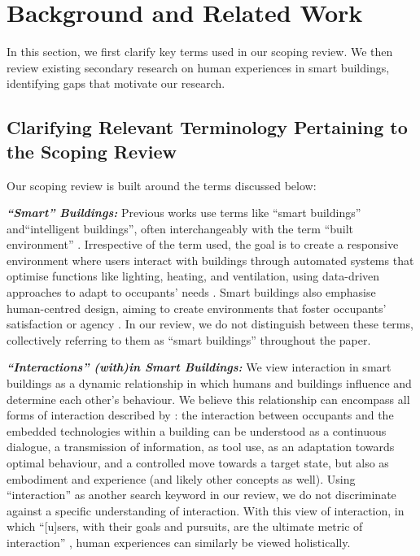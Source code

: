 \section{Background and Related Work}
\label{sec-ch1:background}
In this section, we first clarify key terms used in our scoping review. We then review existing secondary research on human experiences in smart buildings, identifying gaps that motivate our research.

\subsection{Clarifying Relevant Terminology Pertaining to the Scoping Review}
Our scoping review is built around the terms discussed below: 

\textbf{\textit{``Smart'' Buildings:}} Previous works use terms like ``smart buildings'' and``intelligent buildings'', often interchangeably with the term ``built environment'' \cite{buckman2014smart, latifah2020smart}. Irrespective of the term used, the goal is to create a responsive environment where users interact with buildings through automated systems that optimise functions like lighting, heating, and ventilation, using data-driven approaches to adapt to occupants' needs \cite{saputra2023smart}. Smart buildings also emphasise human-centred design, aiming to create environments that foster occupants' satisfaction or agency \cite{mitchell2020no, mitchell2020human}. In our review, we do not distinguish between these terms, collectively referring to them as ``smart buildings'' throughout the paper.

\textbf{\textit{``Interactions'' (with)in Smart Buildings:}} We view interaction in smart buildings as a dynamic relationship in which humans and buildings influence and determine each other's behaviour. We believe this relationship can encompass all forms of interaction described by \citet{hornbaek2017interaction}: the interaction between occupants and the embedded technologies within a building can be understood as a continuous dialogue, a transmission of information, as tool use, as an adaptation towards optimal behaviour, and a controlled move towards a target state, but also as embodiment and experience (and likely other concepts as well). Using ``interaction'' as another search keyword in our review, we do not discriminate against a specific understanding of interaction. With this view of interaction, in which ``[u]sers, with their goals and pursuits, are the ultimate metric of interaction'' \cite{hornbaek2017interaction}, human experiences can similarly be viewed holistically.

